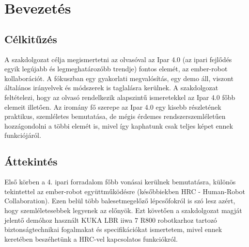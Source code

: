 \documentclass[../documentation.tex]{subfiles}
\begin{document}
\section{Bevezetés}
\subsection{Célkitűzés}
A szakdolgozat célja megismertetni az olvasóval az Ipar 4.0 (az ipari fejlődés egyik legújabb és legmeghatározóbb trendje) fontos elemét, az ember-robot kollaborációt. A fókuszban egy gyakorlati megvalósítás, egy demo áll, viszont általános irányelvek és módszerek is taglalásra kerülnek. A szakdolgozat feltételezi, hogy az olvasó rendelkezik alapszintű ismeretekkel az Ipar 4.0 főbb elemeit illetően. Az iromány fő szerepe az Ipar 4.0 egy kisebb részletének praktikus, szemléletes bemutatása, de mégis érdemes rendszerszemléletűen hozzágondolni a többi elemét is, mivel így kaphatunk csak teljes képet ennek funkciójáról.

\subsection{Áttekintés}
Első körben a 4. ipari forradalom főbb vonásai kerülnek bemutatásra, különös tekintettel az ember-robot együttműködésre (későbbiekben HRC - \foreignlanguage{british}{Human-Robot Collaboration}). Ezen belül több balesetmegelőző lépcsőfokról is szó lesz azért, hogy szemléletesebbek legyenek az előnyök. Ezt követően a szakdolgozat magját jelentő demóhoz használt KUKA LBR iiwa 7 R800 robotkarhoz tartozó biztonságtechnikai fogalmakat és specifikációkat ismertetem, mivel ennek keretében beszéhetünk a HRC-vel kapcsolatos funkciókról.
\end{document}

